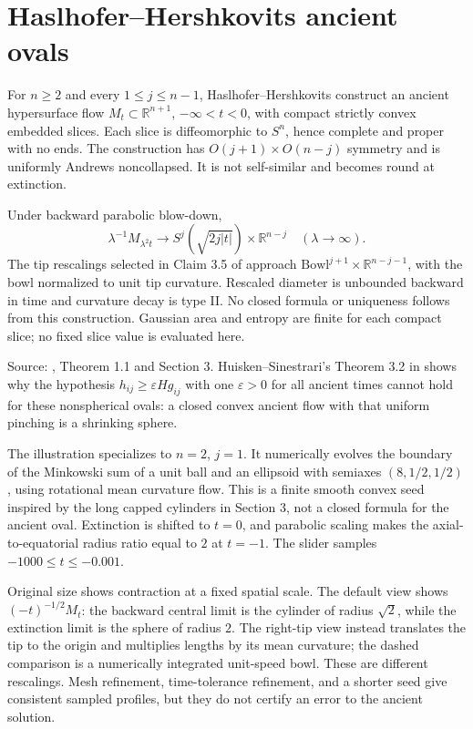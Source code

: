 \chapter{Haslhofer--Hershkovits ancient ovals}\label{sec:catalogue-hh-ancient-ovals}
\begin{example}\label{ex:catalogue-hh-ancient-ovals}
For $n\geq2$ and every $1\leq j\leq n-1$, Haslhofer--Hershkovits construct an ancient hypersurface flow $M_t\subset\mathbb R^{n+1}$, $-\infty<t<0$, with compact strictly convex embedded slices. Each slice is diffeomorphic to $S^n$, hence complete and proper with no ends. The construction has $O(j+1)\times O(n-j)$ symmetry and is uniformly Andrews noncollapsed. It is not self-similar and becomes round at extinction.

Under backward parabolic blow-down,
\[
 \lambda^{-1}M_{\lambda^2t}\longrightarrow S^j(\sqrt{2j|t|})\times\mathbb R^{n-j}\quad(\lambda\to\infty).
\]
The tip rescalings selected in Claim 3.5 of \cite{CatHH13} approach $\mathrm{Bowl}^{j+1}\times\mathbb R^{n-j-1}$, with the bowl normalized to unit tip curvature. Rescaled diameter is unbounded backward in time and curvature decay is type II. No closed formula or uniqueness follows from this construction. Gaussian area and entropy are finite for each compact slice; no fixed slice value is evaluated here.

Source: \cite{CatHH13}, Theorem 1.1 and Section 3. Huisken--Sinestrari's Theorem 3.2 in \cite{CatHS14} shows why the hypothesis $h_{ij}\geq\varepsilon H g_{ij}$ with one $\varepsilon>0$ for all ancient times cannot hold for these nonspherical ovals: a closed convex ancient flow with that uniform pinching is a shrinking sphere.

The illustration specializes to $n=2$, $j=1$. It numerically evolves the boundary of the Minkowski sum of a unit ball and an ellipsoid with semiaxes $(8,1/2,1/2)$, using rotational mean curvature flow. This is a finite smooth convex seed inspired by the long capped cylinders in Section 3, not a closed formula for the ancient oval. Extinction is shifted to $t=0$, and parabolic scaling makes the axial-to-equatorial radius ratio equal to $2$ at $t=-1$. The slider samples $-1000\leq t\leq-0.001$.

Original size shows contraction at a fixed spatial scale. The default view shows $(-t)^{-1/2}M_t$: the backward central limit is the cylinder of radius $\sqrt2$, while the extinction limit is the sphere of radius $2$. The right-tip view instead translates the tip to the origin and multiplies lengths by its mean curvature; the dashed comparison is a numerically integrated unit-speed bowl. These are different rescalings. Mesh refinement, time-tolerance refinement, and a shorter seed give consistent sampled profiles, but they do not certify an error to the ancient solution.
\end{example}

